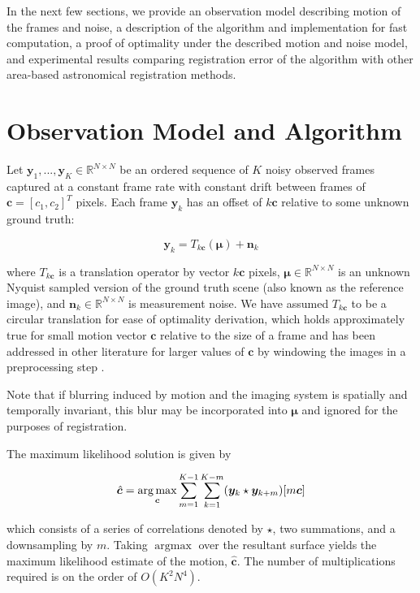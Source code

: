 \documentclass{article}
\newcommand\lstar{\mkern4mu{\star}\mkern4mu}
\DeclareMathOperator*{\argmax}{\arg\max}
\begin{document}
In the next few sections, we provide an observation model describing motion of the frames and noise, a description of the algorithm and implementation for fast computation, a proof of optimality under the described motion and noise model, and experimental results comparing registration error of the algorithm with other area-based astronomical registration methods.

\section{Observation Model and Algorithm}
\label{sec:algorithm}

Let $\bm{y}_1, ..., \bm{y}_K \in \mathbb{R}^{N \times N}$ be an ordered sequence of $K$ noisy observed frames captured at a constant frame rate with constant drift between frames of $\bm{c}=[c_1, c_2]^T$ pixels.  Each frame $\bm{y}_k$ has an offset of $k\bm{c}$ relative to some unknown ground truth:

\begin{equation}
\bm{y}_k = T_{k\bm{c}}(\bm{\mu}) + \bm{n}_k
\label{eq:model}
\end{equation}


where $T_{k\bm{c}}$ is a translation operator by vector $k\bm{c}$ pixels, $\bm{\mu} \in \mathbb{R}^{N \times N}$ is an unknown Nyquist sampled version of the ground truth scene (also known as the reference image), and $\bm{n}_k \in \mathbb{R}^{N \times N}$ is measurement noise.  We have assumed $T_{k\bm{c}}$ to be a circular translation for ease of optimality derivation, which holds approximately true for small motion vector $\bm{c}$ relative to the size of a frame and has been addressed in other literature for larger values of $\bm{c}$ by windowing the images in a preprocessing step \cite{cain2001projection}.

Note that if blurring induced by motion and the imaging system is spatially and temporally invariant, this blur may be incorporated into $\bm{\mu}$ and ignored for the purposes of registration.

The maximum likelihood solution is given by

\begin{equation}
\hat{\bm{c}} = \argmax_{\bm{c}} \sum_{m=1}^{K-1}\sum_{k=1}^{K-m} (\bm{y}_k \lstar \bm{y}_{k+m})[m\bm{c}]
\label{eq:algorithm_orig}
\end{equation}

which consists of a series of correlations denoted by $\star$, two summations, and a downsampling by $m$.  Taking $\argmax$ over the resultant surface yields the maximum likelihood estimate of the motion, $\hat{\bm{c}}$.  The number of multiplications required is on the order of $O(K^2N^4).$
\end{document}
